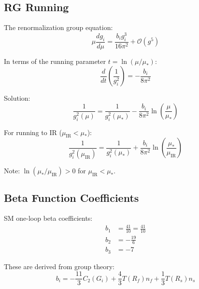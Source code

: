 \documentclass[11pt,a4paper]{article}
\theoremstyle{definition}
\begin{document}
\subsection{RG Running}
\label{subsec:rg}

The renormalization group equation:
\begin{equation}
\label{eq:rg_eq}
\mu \frac{dg_i}{d\mu} = \frac{b_i g_i^3}{16\pi^2} + \mathcal{O}(g^5)
\end{equation}

In terms of the running parameter $t = \ln(\mu/\mu_*)$:
\begin{equation}
\label{eq:rg_t}
\frac{d}{dt}\left(\frac{1}{g_i^2}\right) = -\frac{b_i}{8\pi^2}
\end{equation}

Solution:
\begin{equation}
\label{eq:rg_solution}
\frac{1}{g_i^2(\mu)} = \frac{1}{g_i^2(\mu_*)} - \frac{b_i}{8\pi^2}\ln\left(\frac{\mu}{\mu_*}\right)
\end{equation}

For running to IR ($\mu_{\text{IR}} < \mu_*$):
\begin{equation}
\label{eq:rg_ir}
\frac{1}{g_i^2(\mu_{\text{IR}})} = \frac{1}{g_i^2(\mu_*)} + \frac{b_i}{8\pi^2}\ln\left(\frac{\mu_*}{\mu_{\text{IR}}}\right)
\end{equation}

Note: $\ln(\mu_*/\mu_{\text{IR}}) > 0$ for $\mu_{\text{IR}} < \mu_*$.

\subsection{Beta Function Coefficients}
\label{subsec:beta}

SM one-loop beta coefficients:
\begin{align}
\label{eq:b1}
b_1 &= \frac{41}{10} = \frac{41}{10} \\
\label{eq:b2}
b_2 &= -\frac{19}{6} \\
\label{eq:b3}
b_3 &= -7
\end{align}

These are derived from group theory:
\begin{equation}
\label{eq:beta_formula}
b_i = -\frac{11}{3}C_2(G_i) + \frac{4}{3}T(R_f)n_f + \frac{1}{3}T(R_s)n_s
\end{equation}
\end{document}
